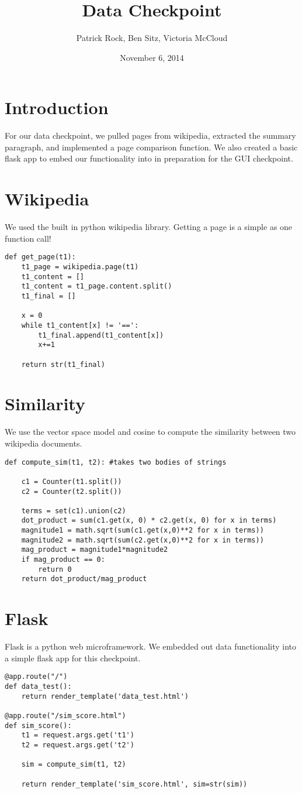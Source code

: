 \documentclass{article}
\title{Data Checkpoint}
\author{Patrick Rock, Ben Sitz, Victoria McCloud}
\date{November 6, 2014}
\begin{document}
\maketitle

\section{Introduction}
For our data checkpoint, we pulled pages from wikipedia, extracted the summary paragraph, and implemented a page comparison
function. We also created a basic flask app to embed our functionality into in preparation for the GUI checkpoint.

\section{Wikipedia}
We used the built in python wikipedia library. Getting a page is a simple as one function call! 

\begin{verbatim}
def get_page(t1):
    t1_page = wikipedia.page(t1)
    t1_content = [] 
    t1_content = t1_page.content.split()
    t1_final = []

    x = 0
    while t1_content[x] != '==':
        t1_final.append(t1_content[x]) 
        x+=1

    return str(t1_final)
\end{verbatim}

\section{Similarity}
We use the vector space model and cosine to compute the similarity between two wikipedia documents. 

\begin{verbatim}
def compute_sim(t1, t2): #takes two bodies of strings

    c1 = Counter(t1.split())
    c2 = Counter(t2.split())

    terms = set(c1).union(c2)
    dot_product = sum(c1.get(x, 0) * c2.get(x, 0) for x in terms)
    magnitude1 = math.sqrt(sum(c1.get(x,0)**2 for x in terms))
    magnitude2 = math.sqrt(sum(c2.get(x,0)**2 for x in terms))
    mag_product = magnitude1*magnitude2
    if mag_product == 0:
        return 0 
    return dot_product/mag_product
\end{verbatim}

\section{Flask}
Flask is a python web microframework. We embedded out data functionality into a simple flask app for this checkpoint.

\begin{verbatim}
@app.route("/")
def data_test():
    return render_template('data_test.html')

@app.route("/sim_score.html")
def sim_score():
    t1 = request.args.get('t1')
    t2 = request.args.get('t2')

    sim = compute_sim(t1, t2)

    return render_template('sim_score.html', sim=str(sim))
\end{verbatim}
\end{document}
